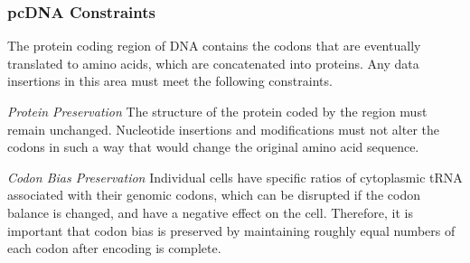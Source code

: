 \documentclass{bioinfo}
\begin{document}
\subsubsection{pcDNA Constraints}

The protein coding region of DNA contains the codons that are eventually translated to amino acids, which are concatenated into proteins. Any data insertions in this area must meet the following constraints.

\textit{Protein Preservation} The structure of the protein coded by the region must remain unchanged. Nucleotide insertions and modifications must not alter the codons in such a way that would change the original amino acid sequence.

\textit{Codon Bias Preservation} Individual cells have specific ratios of cytoplasmic tRNA associated with their genomic codons, which can be disrupted if the codon balance is changed, and have a negative effect on the cell. Therefore, it is important that codon bias is preserved by maintaining roughly equal numbers of each codon after encoding is complete.
\end{document}
